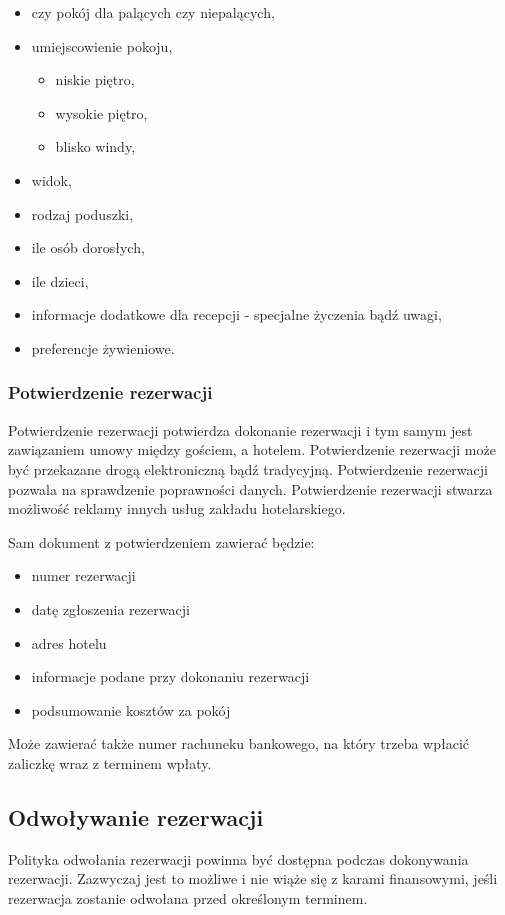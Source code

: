 \documentclass[a4paper,onecolumn,oneside,11pt,wide,floatssmall]{mwrep}
\theoremstyle{definition}
\theoremstyle{plain}%
\theoremstyle{remark}
\begin{document}
\begin{itemize}
  \item czy pokój dla palących czy niepalących,
  \item umiejscowienie pokoju,
  \begin{itemize}
    \item niskie piętro,
    \item wysokie piętro,
    \item blisko windy,
  \end{itemize}
  \item widok,
  \item rodzaj poduszki,
  \item ile osób dorosłych,
  \item ile dzieci,
  \item informacje dodatkowe dla recepcji - specjalne życzenia bądź uwagi,
  \item preferencje żywieniowe.
\end{itemize}


\subsubsection{Potwierdzenie rezerwacji}
Potwierdzenie rezerwacji potwierdza dokonanie rezerwacji i tym samym jest 
zawiązaniem umowy między gościem, a hotelem. Potwierdzenie rezerwacji może 
być przekazane drogą elektroniczną bądź tradycyjną. Potwierdzenie rezerwacji 
pozwala na sprawdzenie poprawności danych. Potwierdzenie rezerwacji stwarza 
możliwość reklamy innych usług zakładu hotelarskiego. 

Sam dokument z potwierdzeniem zawierać będzie:
\begin{itemize}
  \item numer rezerwacji
  \item datę zgłoszenia rezerwacji
  \item adres hotelu
  \item informacje podane przy dokonaniu rezerwacji
  \item podsumowanie kosztów za pokój
\end{itemize}

Może zawierać także numer rachuneku bankowego, na który trzeba wpłacić 
zaliczkę wraz z terminem wpłaty.

\subsection{Odwoływanie rezerwacji}
Polityka odwołania rezerwacji powinna być dostępna podczas dokonywania 
rezerwacji. Zazwyczaj jest to możliwe i nie wiąże się z karami finansowymi, 
jeśli rezerwacja zostanie odwołana przed określonym terminem. 
\end{document}
